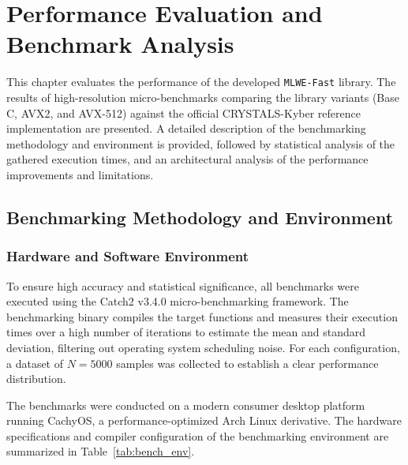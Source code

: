 \chapter{Performance Evaluation and Benchmark Analysis}
\label{ch:performance_evaluation}

This chapter evaluates the performance of the developed \texttt{MLWE-}\allowbreak\texttt{Fast} library. The results of high-resolution micro-benchmarks comparing the library variants (Base C, AVX2, and AVX-512) against the official CRYSTALS-Kyber reference implementation are presented. A detailed description of the benchmarking methodology and environment is provided, followed by statistical analysis of the gathered execution times, and an architectural analysis of the performance improvements and limitations.

\section{Benchmarking Methodology and Environment}
\label{sec:bench_methodology}

\subsection{Hardware and Software Environment}
\label{sub:bench_env}

To ensure high accuracy and statistical significance, all benchmarks were executed using the Catch2 v3.4.0 micro-benchmarking framework. The benchmarking binary compiles the target functions and measures their execution times over a high number of iterations to estimate the mean and standard deviation, filtering out operating system scheduling noise. For each configuration, a dataset of $N = 5000$ samples was collected to establish a clear performance distribution.

The benchmarks were conducted on a modern consumer desktop platform running CachyOS, a performance-optimized Arch Linux derivative. The hardware specifications and compiler configuration of the benchmarking environment are summarized in Table~\ref{tab:bench_env}.

